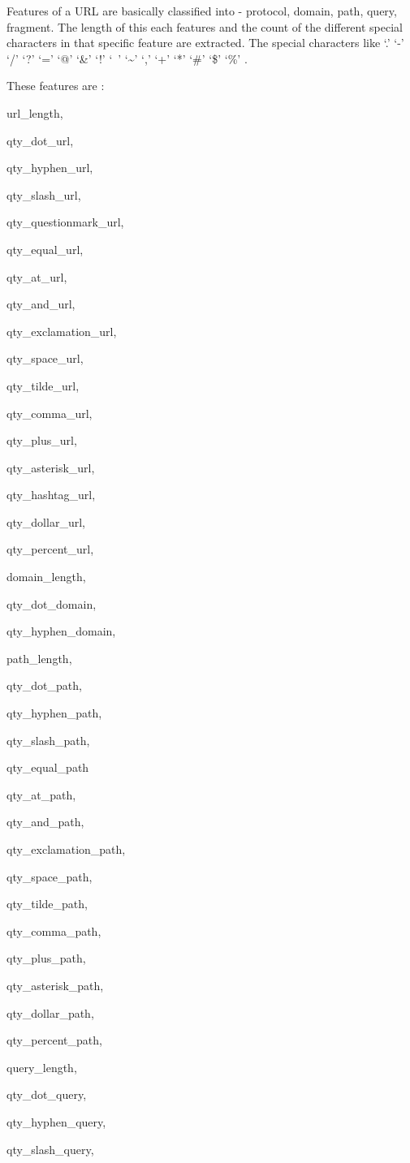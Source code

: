 \documentclass[conference]{IEEEtran}
\begin{document}
\par Features of a URL are basically classified into - protocol, domain, path, query, fragment. The length of this each features and the count of the different special characters in that specific feature are extracted. The special characters like  ‘.’ ‘-’ ‘/’ ‘?’ ‘=’ ‘@’ ‘\&’ ‘!’ ‘\ ’ ‘\textasciitilde' ‘,’ ‘+’ ‘*’ ‘\#’ ‘\$’ ‘\%’ .
\par These features are : \begin{enumerate*}[label=\textbullet]
\item url\_length,\item qty\_dot\_url,\item qty\_hyphen\_url,\item qty\_slash\_url,\item qty\_questionmark\_url,\item qty\_equal\_url,\item qty\_at\_url,\item qty\_and\_url,\item qty\_exclamation\_url,\item qty\_space\_url,\item qty\_tilde\_url,\item qty\_comma\_url,\item qty\_plus\_url,\item qty\_asterisk\_url,\item qty\_hashtag\_url,\item qty\_dollar\_url,\item qty\_percent\_url,\item domain\_length,\item qty\_dot\_domain,\item qty\_hyphen\_domain,\item path\_length,\item qty\_dot\_path,\item qty\_hyphen\_path,\item qty\_slash\_path,\item qty\_equal\_path\item qty\_at\_path,\item qty\_and\_path,\item qty\_exclamation\_path,\item qty\_space\_path,\item qty\_tilde\_path,\item qty\_comma\_path,\item qty\_plus\_path,\item qty\_asterisk\_path,\item qty\_dollar\_path,\item qty\_percent\_path,\item query\_length,\item qty\_dot\_query,\item qty\_hyphen\_query,\item qty\_slash\_query,\item 
\end{enumerate*}
\end{document}
